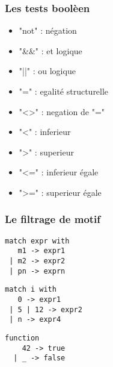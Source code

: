 \begin{frame}
    \frametitle{Les tests boolèen}
	\begin{center}
		\begin{center}
			\begin{minipage}{4cm}
				\begin{itemize}
					\item "not" : négation
					\item "\&\&" : et logique
					\item "||" : ou logique
				\end{itemize}
			\end{minipage}
			\begin{minipage}{5cm}
				\begin{itemize}
					\item "=" : egalité structurelle
					\item "<>" : negation de "="
				\end{itemize}
			\end{minipage}
		\end{center}\vspace{0.2cm}
		\begin{minipage}{4.5cm}
			\begin{itemize}
				\item "<" : inferieur 
				\item ">" : superieur
				\item "<=" : inferieur égale
				\item ">=" : superieur égale
			\end{itemize}
		\end{minipage}
	\end{center}
\end{frame}

\begin{frame}[fragile]
	\frametitle{Le filtrage de motif}
	\begin{center}
	\begin{minipage}{4cm}
		\begin{lstlisting}
match expr with
   m1 -> expr1
 | m2 -> expr2
 | pn -> exprn
		\end{lstlisting}
	\end{minipage}
	\begin{minipage}{5cm}
		\begin{lstlisting}
match i with
   0 -> expr1
 | 5 | 12 -> expr2
 | n -> expr4
		\end{lstlisting}
	\end{minipage}
	
	\begin{minipage}{3cm}
		\begin{lstlisting}
function
    42 -> true
  | _ -> false
		\end{lstlisting} 
	\end{minipage}
	\end{center}
\end{frame}


